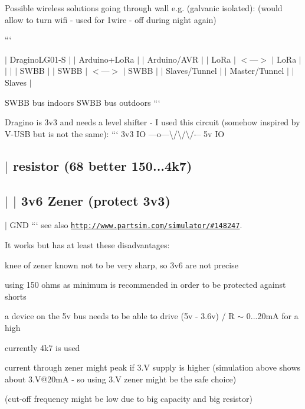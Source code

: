 Possible wireless solutions going through wall e.\-g. (galvanic isolated)\-: (would allow to turn wifi -\/ used for 1wire -\/ off during night again)

``` 

 $\vert$ Dragino\-L\-G01-\/\-S $\vert$ $\vert$ Arduino+\-Lo\-Ra $\vert$ $\vert$ Arduino/\-A\-V\-R $\vert$ $\vert$ Lo\-Ra $\vert$ $<$---$>$ $\vert$ Lo\-Ra $\vert$ $\vert$ $\vert$ $\vert$ S\-W\-B\-B $\vert$ $\vert$ S\-W\-B\-B $\vert$ $<$---$>$ $\vert$ S\-W\-B\-B $\vert$ $\vert$ Slaves/\-Tunnel $\vert$ $\vert$ Master/\-Tunnel $\vert$ $\vert$ Slaves $\vert$ 

 S\-W\-B\-B bus indoors S\-W\-B\-B bus outdoors ```

Dragino is 3v3 and needs a level shifter -\/ I used this circuit (somehow inspired by V-\/\-U\-S\-B but is not the same)\-: ``` 3v3 I\-O ---o---\textbackslash{}/\textbackslash{}/\textbackslash{}/-\/-- 5v I\-O \subsection*{$\vert$ resistor (68 better 150...4k7) }

\subsection*{$\vert$ $\vert$ 3v6 Zener (protect 3v3) }

$\vert$ G\-N\-D ``` see also \href{http://www.partsim.com/simulator/#148247}{\tt http\-://www.\-partsim.\-com/simulator/\#148247}.

It works but has at least these disadvantages\-:
\begin{DoxyItemize}
\item knee of zener known not to be very sharp, so 3v6 are not precise
\item using 150 ohms as minimum is recommended in order to be protected against shorts
\begin{DoxyItemize}
\item a device on the 5v bus needs to be able to drive (5v -\/ 3.\-6v) / R $\sim$ 0...20m\-A for a high
\item currently 4k7 is used
\item current through zener might peak if 3.\-V supply is higher (simulation above shows about 3.\-V@20m\-A -\/ so using 3.\-V zener might be the safe choice)
\end{DoxyItemize}
\item (cut-\/off frequency might be low due to big capacity and big resistor)
\end{DoxyItemize}

